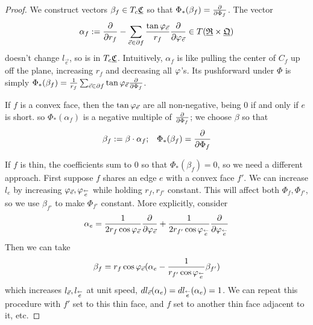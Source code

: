 \begin{proof}
We construct vectors $\beta_f \in T_c {\underline{\mathfrak{C}}}$ so that
$\Phi_*(\beta_f) = {\frac{\partial}{\partial \Phi_f}}$.
The vector
\begin{equation}
\label{e:alpha_f}
\alpha_f := {\frac{\partial}{\partial r_f}} - \sum_{\vec{e} \in \partial f} 
	\frac{\tan \varphi_{\vec{e}}}{r_f} {\frac{\partial}{\partial \varphi_{\vec{e}}}}
	\in T({\underline{\mathfrak{R}}} \times {\underline{\mathfrak{Q}}})
\end{equation}
doesn't change $l_{\vec{e}}$,
so is in $T_c {\underline{\mathfrak{C}}}$.
Intuitively, $\alpha_f$ is like
pulling the center of $C_f$ up off the plane, increasing $r_f$ and decreasing all
$\varphi$'s.
Its pushforward under $\Phi$ is simply
$\Phi_*(\beta_f) = \frac{1}{r_f} \sum_{\vec{e}\in \partial f} \tan \varphi_{\vec{e}}
	{\frac{\partial}{\partial \Phi_f}}$.


If $f$ is a convex face, then the $\tan \varphi_{\vec{e}}$ are all non-negative,
being 0 if and only if $e$ is short.
so $\Phi_*(\alpha_f)$ is a negative multiple of ${\frac{\partial}{\partial \Phi_f}}$;
we choose $\beta$ so that
\begin{equation}
\label{e:beta_f_convex}
\beta_f := \beta \cdot \alpha_f; \;\;\;
\Phi_*(\beta_f) = {\frac{\partial}{\partial \Phi_f}}
\end{equation}


If $f$ is thin, the coefficients sum to 0 so that $\Phi_*(\beta_f) = 0$,
so we need a different approach. First suppose $f$ shares an edge
$e$ with a convex face $f'$. We can increase $l_e$
by increasing $\varphi_{\vec{e}},\varphi_{\overset{\leftarrow}{e}}$
while holding $r_f,r_{f'}$ constant.
This will affect both $\Phi_f, \Phi_{f'}$,
so we use $\beta_{f'}$ to make $\Phi_{f'}$ constant.
More explicitly, consider
\begin{equation}
\label{e:alpha_e}
\alpha_e = \frac{1}{2 r_f \cos \varphi_{\vec{e}}} {\frac{\partial}{\partial \varphi_{\vec{e}}}}
+ \frac{1}{2 r_{f'}\cos \varphi_{\overset{\leftarrow}{e}}} {\frac{\partial}{\partial \varphi_{\overset{\leftarrow}{e}}}}
\end{equation}
Then we can take
\begin{equation}
\label{e:beta_f_thin}
\beta_f = r_f \cos \varphi_{\vec{e}}
	(\alpha_e - \frac{1}{r_{f'} \cos \varphi_{\overset{\leftarrow}{e}}} \beta_{f'})
\end{equation}
which increases $l_{\vec{e}}, l_{\overset{\leftarrow}{e}}$ at unit speed,
$dl_{\vec{e}}(\alpha_e) = dl_{\overset{\leftarrow}{e}}(\alpha_e) = 1$.
We can repeat this procedure with $f'$ set to this thin face,
and $f$ set to another thin face adjacent to it, etc.
\end{proof}

